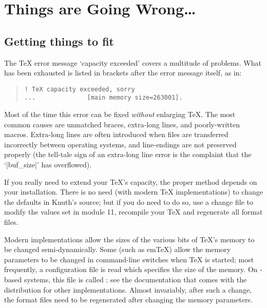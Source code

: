 
\section{Things are Going Wrong\dots{}}

\subsection{Getting things to fit}

The \TeX{} error message `capacity exceeded' covers a multitude of
problems.  What has been exhausted is listed in brackets after the
error message itself, as in:
\begin{quote}
\begin{verbatim}
! TeX capacity exceeded, sorry
...              [main memory size=263001].
\end{verbatim}
\end{quote}
Most of the time this error can be fixed
\emph{without} enlarging \TeX{}. The most common causes are unmatched braces,
extra-long lines, and poorly-written macros. Extra-long lines are
often introduced when files are transferred incorrectly between
operating systems, and line-endings are not preserved properly (the
tell-tale sign of an extra-long line error is the complaint
that the `|buf_size|' has overflowed).

If you really need to extend your \TeX{}'s capacity, the proper method
depends on your installation.  There is no need (with modern \TeX{}
implementations) to change the defaults in Knuth's  source;
but if you do need to do so, use a change file to modify the values set in
module 11, recompile your \TeX{} and regenerate all format files.

Modern implementations allow the sizes of the various bits of \TeX{}'s
memory to be changed semi-dynamically.  Some (such as em\TeX{}) allow
the memory parameters to be changed in command-line switches when
\TeX{} is started; most frequently, a configuration file is read which
specifies the size of the memory.  On -based systems,
this file is called : see the documentation that comes
with the distribution for other implementations.  Almost invariably,
after such a change, the format files need to be regenerated after
changing the memory parameters.



